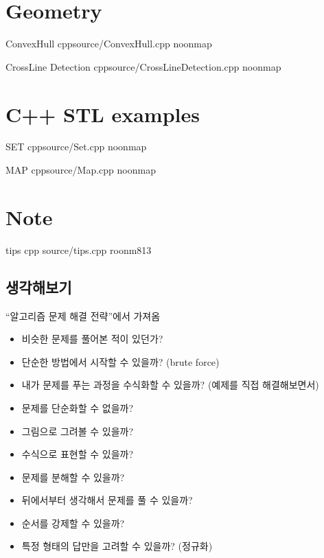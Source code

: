 \documentclass[landscape, 10pt, a4paper, oneside, twocolumn]{extarticle}
\begin{document}
\section{Geometry}

\Algorithm
{ConvexHull}
{}
{}
{cpp}{source/ConvexHull.cpp}
{noonmap}

\Algorithm
{CrossLine Detection}
{}
{}
{cpp}{source/CrossLineDetection.cpp}
{noonmap}


\section{C++ STL examples}
\Algorithm
{SET}
{}
{}
{cpp}{source/Set.cpp}
{noonmap}

\Algorithm
{MAP}
{}
{}
{cpp}{source/Map.cpp}
{noonmap}

\section{Note}
\Algorithm
{tips}
{}
{}
{cpp}
{source/tips.cpp}
{roonm813}

\subsection{생각해보기}
``알고리즘 문제 해결 전략''에서 가져옴
\begin{itemize}
\item 비슷한 문제를 풀어본 적이 있던가?
\item 단순한 방법에서 시작할 수 있을까? (brute force)
\item 내가 문제를 푸는 과정을 수식화할 수 있을까? (예제를 직접 해결해보면서)
\item 문제를 단순화할 수 없을까?
\item 그림으로 그려볼 수 있을까?
\item 수식으로 표현할 수 있을까?
\item 문제를 분해할 수 있을까?
\item 뒤에서부터 생각해서 문제를 풀 수 있을까?
\item 순서를 강제할 수 있을까?
\item 특정 형태의 답만을 고려할 수 있을까? (정규화)
\end{itemize}
\end{document}
